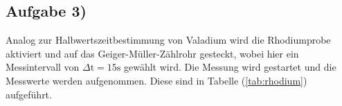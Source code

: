 \subsection{Aufgabe 3)}
Analog zur Halbwertszeitbestimmung von Valadium wird die Rhodiumprobe aktiviert und auf das Geiger-Müller-Zählrohr gesteckt,
wobei hier ein Messintervall von $\Delta \text{t} = 15 \si{\second}$ gewählt wird.
Die Messung wird gestartet und die Messwerte werden aufgenommen.
Diese sind in Tabelle (\ref{tab:rhodium}) aufgeführt.